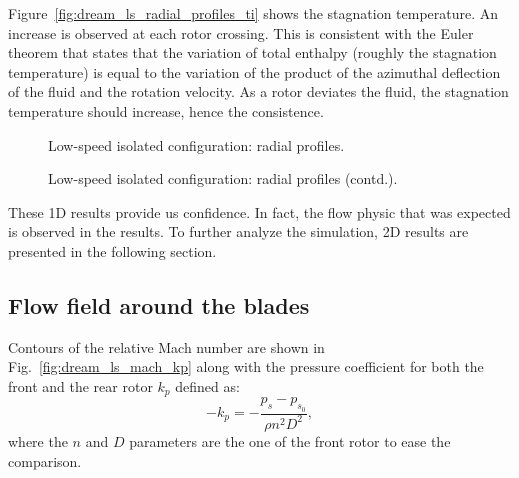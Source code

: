 Figure~\ref{fig:dream_ls_radial_profiles_ti}
shows the stagnation temperature.
An increase is observed at each 
rotor crossing. This is consistent with the
Euler theorem that states that the variation of total enthalpy (roughly
the stagnation temperature) is equal to the variation of the product of
the azimuthal deflection of the fluid and the rotation velocity. As a rotor
deviates the fluid, the stagnation temperature should increase, 
hence the consistence.
\begin{figure}[htp]
  \centering
  \caption{Low-speed isolated configuration: radial profiles.}
\end{figure}
\begin{figure}[htp]
  \centering
  \setcounter{subfigure}{3}
  \caption{Low-speed isolated configuration: radial profiles (contd.).}
  \label{fig:dream_ls_radial_profiles}
\end{figure}

These 1D results provide us confidence. In fact, the flow physic that
was expected is observed in the results. To further analyze the simulation,
2D results are presented in the following section.

\subsection{Flow field around the blades}
\label{sub:dream_ls_flow_field}

Contours of the relative Mach number are shown in 
Fig.~\ref{fig:dream_ls_mach_kp} along with the pressure coefficient
for both the front and the rear rotor
$k_p$ defined as:
\begin{equation}
   -k_p = - \frac{p_s - p_{s_0}}{\rho n^2 D^2},
\end{equation}
where the $n$ and $D$ parameters are the one of the front rotor
to ease the comparison.

